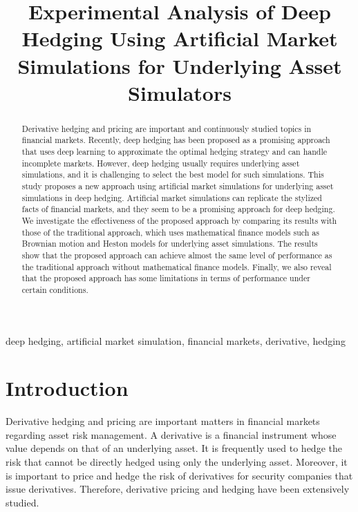 
\title{Experimental Analysis of Deep Hedging Using Artificial Market Simulations for Underlying Asset Simulators}
\maketitle

\begin{abstract}
    Derivative hedging and pricing are important and continuously studied topics in financial markets.
    Recently, deep hedging has been proposed as a promising approach that uses deep learning to approximate the optimal hedging strategy and can handle incomplete markets.
    However, deep hedging usually requires underlying asset simulations, and it is challenging to select the best model for such simulations.
    This study proposes a new approach using artificial market simulations for underlying asset simulations in deep hedging.
    Artificial market simulations can replicate the stylized facts of financial markets, and they seem to be a promising approach for deep hedging.
    We investigate the effectiveness of the proposed approach by comparing its results with those of the traditional approach, which uses mathematical finance models such as Brownian motion and Heston models for underlying asset simulations.
    The results show that the proposed approach can achieve almost the same level of performance as the traditional approach without mathematical finance models.
    Finally, we also reveal that the proposed approach has some limitations in terms of performance under certain conditions.
\end{abstract}

\begin{IEEEkeywords}
    deep hedging, artificial market simulation, financial markets, derivative, hedging
\end{IEEEkeywords}

\section{Introduction}
Derivative hedging and pricing are important matters in financial markets regarding asset risk management.
A derivative is a financial instrument whose value depends on that of an underlying asset.
It is frequently used to hedge the risk that cannot be directly hedged using only the underlying asset.
Moreover, it is important to price and hedge the risk of derivatives for security companies that issue derivatives.
Therefore, derivative pricing and hedging have been extensively studied.

